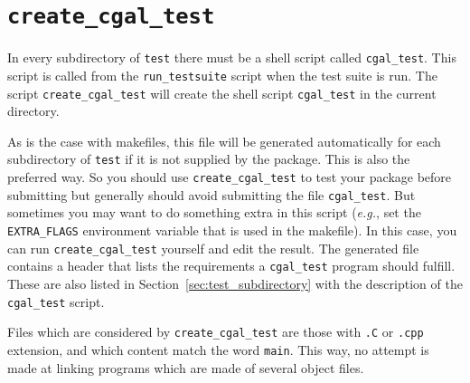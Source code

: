 \section{{\tt create\_cgal\_test}}
\label{sec:create_cgal_test}

In every subdirectory of {\tt test} there must be a shell script called
{\tt cgal\_test}. This script is called from the {\tt run\_testsuite}%
script when the test suite is run. The script
{{\tt create\_cgal\_test}}
will create the shell script {\tt cgal\_test} in the current directory.

As is the case with makefiles, this file will be generated automatically for
each subdirectory of {\tt test} if
it is not supplied by the package. This is also the preferred way.
So you should use {\tt create\_cgal\_test} to test your package before
submitting but generally should avoid submitting the file {\tt cgal\_test}.
But sometimes you may want to do something extra in this script ({\em e.g.}, set
the {\tt EXTRA\_FLAGS}
environment variable that is used in the makefile).
In this case, you can run {\tt create\_cgal\_test} yourself and edit the result.
The generated file contains a header that lists the requirements a
{\tt cgal\_test} program should fulfill. These are also listed in
Section~\ref{sec:test_subdirectory} with the description of the
{\tt cgal\_test} script.

Files which are considered by {{\tt create\_cgal\_test}} are those with
{\tt .C} or {\tt .cpp} extension, and which content match the word {\tt main}.
This way, no attempt is made at linking programs which are made of several
object files.


